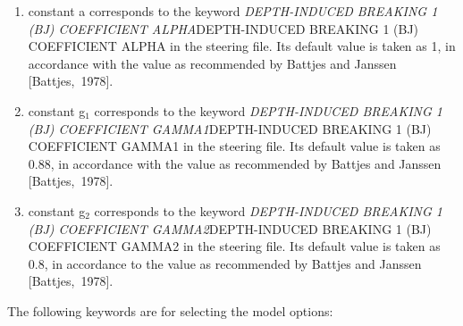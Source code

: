 \begin{enumerate}
\item  constant a corresponds to the keyword \textit{DEPTH-INDUCED BREAKING 1 (BJ) COEFFICIENT ALPHA}DEPTH-INDUCED BREAKING 1 (BJ) COEFFICIENT ALPHA\textit{ }in the steering file. Its default value is taken as 1, in accordance with the value as recommended by Battjes and Janssen [Battjes,~1978].

\item  constant g${}_{1}$ corresponds to the keyword \textit{DEPTH-INDUCED BREAKING 1 (BJ) COEFFICIENT GAMMA1}DEPTH-INDUCED BREAKING 1 (BJ) COEFFICIENT GAMMA1\textit{ }in the steering file. Its default value is taken as 0.88, in accordance with the value as recommended by Battjes and Janssen [Battjes,~1978].

\item  constant g${}_{2}$ corresponds to the keyword \textit{DEPTH-INDUCED BREAKING 1 (BJ) COEFFICIENT GAMMA2}DEPTH-INDUCED BREAKING 1 (BJ) COEFFICIENT GAMMA2\textit{ }in the steering file. Its default value is taken as 0.8, in accordance to the value as recommended by Battjes and Janssen [Battjes,~1978].
\end{enumerate}

 The following keywords are for selecting the model options:

